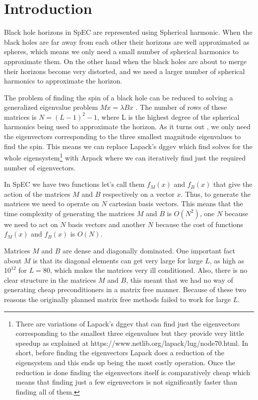 \documentclass[%
 reprint,
 amsmath,amssymb,
 aps,
]{revtex4-2}
\begin{document}

\section{\label{sec:Introduction} Introduction}

Black hole horizons in SpEC are represented using Spherical harmonic. When the black holes are far away from each other their horizons are well approximated as spheres, which means we only need a small number of spherical harmonics to approximate them. On the other hand when the black holes are about to merge their horizons become very distorted, and we need a larger number of spherical harmonics to approximate the horizon. 

The problem of finding the spin of a black hole can be reduced to solving a generalized eigenvalue problem $M x = \lambda B x$ \cite{lovelace_binary-black-hole_2008}. The number of rows of these matrices is $N = (L-1)^2 -1$, where L is the highest degree of the spherical harmonics being used to approximate the horizon. As it turns out \cite{lovelace_binary-black-hole_2008}, we only need the eigenvectors corresponding to the three smallest magnitude eigenvalues to find the spin. This means we can replace Lapack's dggev which find solves for the whole eigensystem\footnote{There are variations of Lapack's dggev that can find just the eigenvectors corresponding to the smallest three eigenvalues but they provide very little speedup as explained at https://www.netlib.org/lapack/lug/node70.html. In short, before finding the eigenvectors Lapack does a reduction of the eigensystem and this ends up being the most costly operation. Once the reduction is done finding the eigenvectors itself is comparatively cheap which means that finding just a few eigenvectors is not significantly faster than finding all of them.} with Arpack where we can iteratively find just the required number of eigenvectors.

In SpEC we have two functions let's call them $f_M(x)$ and $f_B(x)$ that give the action of the matrices $M$ and $B$ respectively on a vector $x$. Thus, to generate the matrices we need to operate on $N$ cartesian basis vectors. This means that the time complexity of generating the matrices $M$ and $B$ is $O(N^2)$, one $N$ because we need to act on $N$ basis vectors and another $N$ because the cost of functions $f_M(x)$ and $f_B(x)$ is $O(N)$.


Matrices $M$ and $B$ are dense and diagonally dominated. One important fact about $M$ is that its diagonal elements can get very large for large $L$, as high as $10^{12}$ for $L = 80$, which makes the matrices very ill conditioned. Also, there is no clear structure in the matrices $M$ and $B$, this meant that we had no way of generating cheap preconditioners in a matrix free manner. Because of these two reasons the originally planned matrix free methods failed to work for large $L$. 
\end{document}
